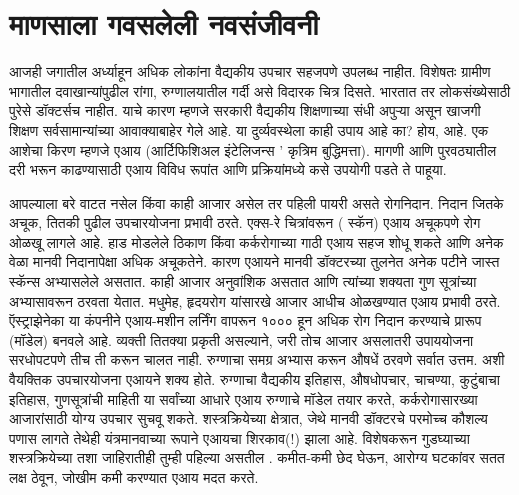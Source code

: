 \chapter{माणसाला गवसलेली नवसंजीवनी}

आजही जगातील अर्ध्याहून अधिक लोकांना वैद्यकीय उपचार सहजपणे उपलब्ध नाहीत. विशेषतः ग्रामीण भागातील दवाखान्यांपुढील रांगा, रुग्णालयातील गर्दी असे विदारक चित्र दिसते. भारतात तर लोकसंख्येसाठी पुरेसे डॉक्टर्सच नाहीत. याचे कारण म्हणजे सरकारी वैद्यकीय शिक्षणाच्या संधी अपुऱ्या असून खाजगी शिक्षण सर्वसामान्यांच्या आवाक्याबाहेर गेले आहे. या दुर्व्यवस्थेला काही उपाय आहे का? होय, आहे. एक आशेचा किरण म्हणजे एआय (आर्टिफिशिअल इंटेलिजन्स ' कृत्रिम बुद्धिमत्ता). मागणी आणि पुरवठ्यातील दरी भरून काढण्यासाठी एआय विविध रूपांत आणि प्रक्रियांमध्ये कसे उपयोगी पडते ते पाहूया.

आपल्याला बरे वाटत नसेल किंवा काही आजार असेल तर पहिली पायरी असते रोगनिदान. निदान जितके अचूक, तितकी पुढील उपचारयोजना प्रभावी ठरते. एक्स-रे चित्रांवरून ( स्कॅन) एआय अचूकपणे रोग ओळखू लागले आहे. हाड मोडलेले ठिकाण किंवा कर्करोगाच्या गाठी एआय सहज शोधू शकते आणि अनेक वेळा मानवी निदानापेक्षा अधिक अचूकतेने. कारण एआयने मानवी डॉक्टरच्या तुलनेत अनेक पटीने जास्त स्कॅन्स अभ्यासलेले असतात. काही आजार अनुवांशिक असतात आणि त्यांच्या शक्यता गुण सूत्रांच्या अभ्यासावरून ठरवता येतात.  मधुमेह, हृदयरोग यांसारखे आजार आधीच ओळखण्यात एआय प्रभावी ठरते. ऍस्ट्राझेनेका या कंपनीने एआय-मशीन लर्निंग वापरून १००० हून अधिक रोग निदान करण्याचे प्रारूप (मॉडेल) बनवले आहे. व्यक्ती तितक्या प्रकृती असल्याने, जरी तोच आजार असलातरी उपाययोजना सरधोपटपणे तीच ती करून चालत नाही. रुग्णाचा समग्र अभ्यास करून औषधें ठरवणे सर्वात उत्तम. अशी वैयक्तिक उपचारयोजना एआयने शक्य होते. रुग्णाचा वैद्यकीय इतिहास, औषधोपचार, चाचण्या, कुटुंबाचा इतिहास, गुणसूत्रांची माहिती या सर्वांच्या आधारे एआय रुग्णाचे मॉडेल तयार करते,  कर्करोगासारख्या आजारांसाठी योग्य उपचार सुचवू शकते.  शस्त्रक्रियेच्या क्षेत्रात, जेथे मानवी डॉक्टरचे परमोच्च कौशल्य पणास लागते तेथेही यंत्रमानवाच्या रूपाने एआयचा शिरकाव(!) झाला आहे. विशेषकरून गुडघ्याच्या शस्त्रक्रियेच्या तशा जाहिरातीही तुम्ही पहिल्या असतील . कमीत-कमी छेद घेऊन, आरोग्य घटकांवर सतत लक्ष ठेवून, जोखीम कमी करण्यात एआय मदत करते.

